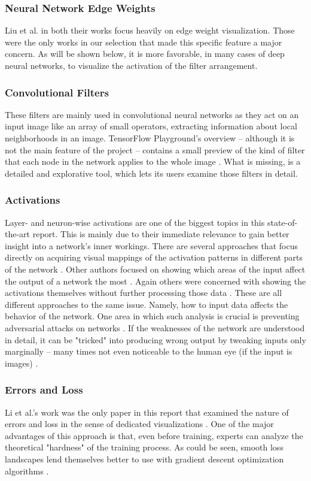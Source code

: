 \documentclass{acmsiggraph}               %
\begin{document}
\subsubsection{Neural Network Edge Weights}
Liu et al. in both their works \cite{Liu2016,Liu2018} focus heavily on edge weight visualization. Those were the only works in our selection that made this specific feature a major concern. As will be shown below, it is more favorable, in many cases of deep neural networks, to visualize the activation of the filter arrangement.
\subsubsection{Convolutional Filters}
These filters are mainly used in convolutional neural networks as they act on an input image like an array of small operators, extracting information about local neighborhoods in an image. TensorFlow Playground's overview -- although it is not the main feature of the project -- contains a small preview of the kind of filter that each node in the network applies to the whole image \cite{Smilkov2017}. What is missing, is a detailed and explorative tool, which lets its users examine those filters in detail.
\subsubsection{Activations}
Layer- and neuron-wise activations are one of the biggest topics in this state-of-the-art report. This is mainly due to their immediate relevance to gain better insight into a network's inner workings.
There are several approaches that focus directly on acquiring visual mappings of the activation patterns in different parts of the network \cite{Yosinski2015,Nguyen2016}. Other authors focused on showing which areas of the input affect the output of a network the most \cite{Samek2017}. Again others were concerned with showing the activations themselves without further processing those data \cite{Liu2018}. These are all different approaches to the same issue. Namely, how to input data affects the behavior of the network. One area in which such analysis is crucial is preventing adversarial attacks on networks \cite{Hohman2018}. If the weaknesses of the network are understood in detail, it can be "tricked" into producing wrong output by tweaking inputs only marginally -- many times not even noticeable to the human eye (if the input is images) \cite{Hohman2018}.
\subsubsection{Errors and Loss}
Li et al.'s work was the only paper in this report that examined the nature of errors and loss in the sense of dedicated visualizations \cite{Li2017}. One of the major advantages of this approach is that, even before training, experts can analyze the theoretical "hardness" of the training process. As could be seen, smooth loss landscapes lend themselves better to use with gradient descent optimization algorithms \cite{Li2017}.
\end{document}
